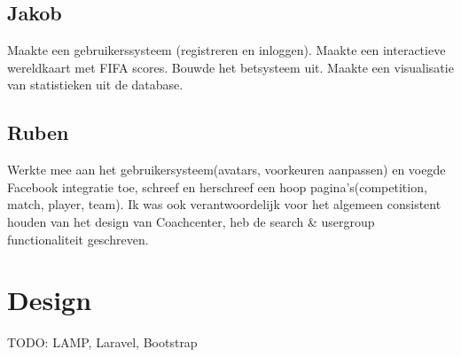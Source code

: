 \documentclass[11pt, a4paper]{article}
\begin{document}
\subsection{Jakob}
Maakte een gebruikerssysteem (registreren en inloggen). Maakte een interactieve wereldkaart met FIFA scores. Bouwde het betsysteem uit. Maakte een visualisatie van statistieken uit de database.
\subsection{Ruben}
Werkte mee aan het gebruikersysteem(avatars, voorkeuren aanpassen) en voegde Facebook integratie toe, schreef en herschreef een hoop pagina's(competition, match, player, team). Ik was ook verantwoordelijk voor het algemeen consistent houden van het design van Coachcenter, heb de search & usergroup functionaliteit geschreven.


\section{Design}
TODO: LAMP, Laravel, Bootstrap
\end{document}
